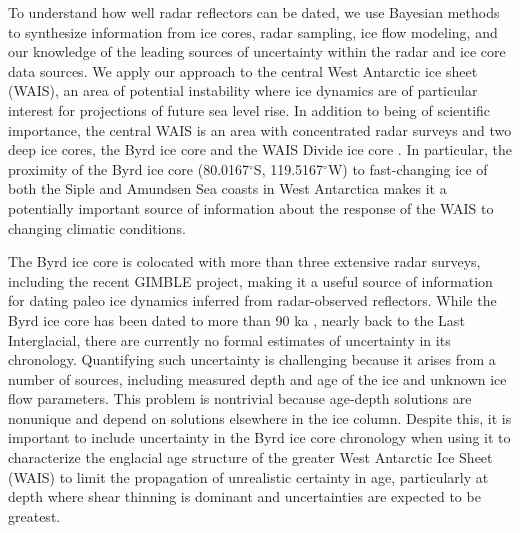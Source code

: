 To understand how well radar reflectors can be dated, we use Bayesian methods \citep{metropolis,hastings,etc} to synthesize information from ice cores, radar sampling, ice flow modeling, and our knowledge of the leading sources of uncertainty within the radar and ice core data sources. We apply our approach to the central West Antarctic ice sheet (WAIS), an area of potential instability where ice dynamics are of particular interest for projections of future sea level rise. In addition to being of scientific importance, the central WAIS is an area with concentrated radar surveys and two deep ice cores, the Byrd ice core \citep{gow1968} and the WAIS Divide ice core \citep{wais}. In particular, the proximity of the Byrd ice core (80.0167$^\circ$S, 119.5167$^\circ$W) to fast-changing ice of both the Siple and Amundsen Sea coasts in West Antarctica makes it a potentially important source of information about the response of the WAIS to changing climatic conditions.


The Byrd ice core is colocated with more than three extensive radar surveys, including the recent GIMBLE project, making it a useful source of information for dating paleo ice dynamics inferred from radar-observed reflectors. While the Byrd ice core has been dated to more than 90 ka \citep{blunier2001}, nearly back to the Last Interglacial, there are currently no formal estimates of uncertainty in its chronology. Quantifying such uncertainty is challenging because it arises from a number of sources, including measured depth and age of the ice and unknown ice flow parameters. This problem is nontrivial because age-depth solutions are nonunique and depend on solutions elsewhere in the ice column. Despite this, it is important to include uncertainty in the Byrd ice core chronology when using it to characterize the englacial age structure of the greater West Antarctic Ice Sheet (WAIS) to limit the propagation of unrealistic certainty in age, particularly at depth where shear thinning is dominant and uncertainties are expected to be greatest. 

 

